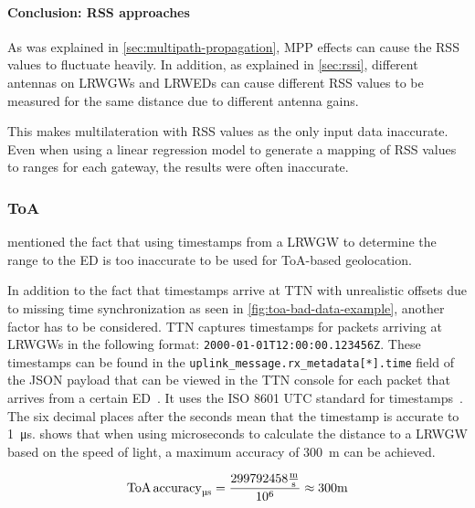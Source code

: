 \paragraph{Conclusion: \acl{RSS} approaches}

As was explained in \cref{sec:multipath-propagation}, \acl{MPP} effects can cause the \ac{RSS} values to fluctuate heavily.
In addition, as explained in \cref{sec:rssi}, different antennas on \aclp{LRWGW} and \aclp{LRWED} can cause different \ac{RSS} values to be measured for the same distance due to different antenna gains.

This makes multilateration with \ac{RSS} values as the only input data inaccurate.
Even when using a linear regression model to generate a mapping of \ac{RSS} values to ranges for each gateway, the results were often inaccurate.

\subsubsection{\acl{ToA}}\label{subsec:conclusion-toa-tdoa}

 mentioned the fact that using timestamps from a \acl{LRWGW} to determine the range to the \acl{ED} is too inaccurate to be used for \ac{ToA}-based geolocation.

In addition to the fact that timestamps arrive at \ac{TTN} with unrealistic offsets due to missing time synchronization as seen in \cref{fig:toa-bad-data-example}, another factor has to be considered.
\ac{TTN} captures timestamps for packets arriving at \aclp{LRWGW} in the following format: \lstinline|2000-01-01T12:00:00.123456Z|.
These timestamps can be found in the \lstinline|uplink_message.rx_metadata[*].time| field of the \ac{JSON} payload that can be viewed in the \ac{TTN} console for each packet that arrives from a certain \acl{ED}~\cite{the_things_industries_bv_data_2023}.
It uses the \ac{ISO} 8601 \ac{UTC} standard for timestamps~\cite{newman_date_2002}.
The six decimal places after the seconds mean that the timestamp is accurate to \SI{1}{\micro\second}.
 shows that when using microseconds to calculate the distance to a \acl{LRWGW} based on the speed of light, a maximum accuracy of \SI{300}{\meter} can be achieved.

\begin{equation}\label{eq:toa-accuracy-ttn-microseconds}
    \text{ToA\,accuracy}_{\si{\micro\second}} = \frac{299792458 \frac{\si{\meter}}{\si{\second}}}{10^6} \approx 300 \si{\meter}
\end{equation}

